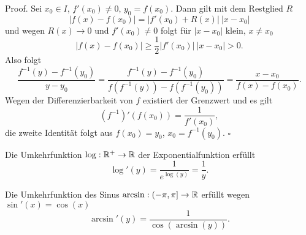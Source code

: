 \begin{emphBox}{}{}
Proof. Sei \(x_0 \in I\), \(f'(x_0) \neq 0\), \(y_0 =f(x_0)\). Dann gilt mit dem Restglied \(R\)
\begin{equation*}
 \vert f(x) - f(x_0) \vert = \vert f'(x_0) + R(x) \vert ~\vert x- x_0\vert
\end{equation*}
und wegen \(R(x) \rightarrow 0\) und \(f'(x_0) \neq 0\) folgt für \(|x-x_0|\) klein, \(x \neq x_0\)
\begin{equation*}
 |f(x) - f(x_0)| \geq \frac{1}2 |f'(x_0)| ~|x-x_0| > 0.
\end{equation*}
Also folgt
\begin{equation*}
\frac{f^{-1}(y) - f^{-1}(y_0)}{y-y_0} =  \frac{f^{-1}(y) - f^{-1}(y_0)}{f(f^{-1}(y)) - f(f^{-1}(y_0))} =\frac{x -x_0}{f(x) - f(x_0)}.
\end{equation*}
Wegen der Differenzierbarkeit von \(f\) existiert der Grenzwert und es gilt
\begin{equation*}
 (f^{-1})'(f(x_0)) = \frac{1}{f'(x_0)},
\end{equation*}
die zweite Identität folgt aus \(f(x_0)=y_0\), \(x_0 = f^{-1}(y_0)\). \(\square\)
\end{emphBox}
\label{differential/kombfkt:example-6}
\begin{example}{}{}



Die Umkehrfunktion \(\log: \mathbb{R}^+ \rightarrow \mathbb{R}\) der Exponentialfunktion erfüllt
\begin{equation*}
 \log'(y)  = \frac{1}{e^{\log(y)}} = \frac{1}y.
\end{equation*}\end{example}
\label{differential/kombfkt:example-7}
\begin{example}{}{}



Die Umkehrfunktion des Sinus \(\arcsin: (-\pi,\pi] \rightarrow \mathbb{R}\)   erfüllt wegen \(\sin'(x) = \cos(x)\)
\begin{equation*}
 \arcsin'(y)  = \frac{1}{ \cos(\arcsin(y))} .
\end{equation*}\end{example}



